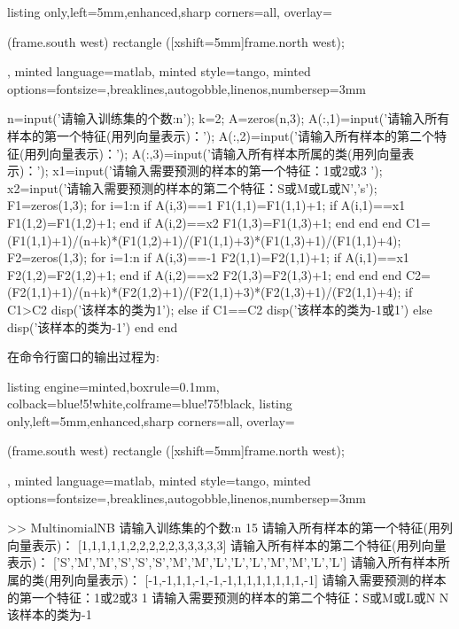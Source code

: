 \documentclass{article}
\begin{document}
\begin{homeworkProblem}
\begin{tcblisting}
{listing only,left=5mm,enhanced,sharp corners=all,
overlay={\begin{tcbclipinterior} (frame.south west)
rectangle ([xshift=5mm]frame.north west);\end{tcbclipinterior}},
minted language=matlab,
minted style=tango,
minted options={fontsize=\normalsize,breaklines,autogobble,linenos,numbersep=3mm}}
n=input('请输入训练集的个数:n\n');
k=2; A=zeros(n,3);%
A(:,1)=input('请输入所有样本的第一个特征(用列向量表示)：\n');
A(:,2)=input('请输入所有样本的第二个特征(用列向量表示)：\n');
A(:,3)=input('请输入所有样本所属的类(用列向量表示)：\n');
x1=input('请输入需要预测的样本的第一个特征：1或2或3 \n');
x2=input('请输入需要预测的样本的第二个特征：S或M或L或N\n','s');
F1=zeros(1,3);
for i=1:n
    if A(i,3)==1
        F1(1,1)=F1(1,1)+1;
        if A(i,1)==x1
            F1(1,2)=F1(1,2)+1;
        end
        if A(i,2)==x2
            F1(1,3)=F1(1,3)+1;
        end
    end
end
C1=(F1(1,1)+1)/(n+k)*(F1(1,2)+1)/(F1(1,1)+3)*(F1(1,3)+1)/(F1(1,1)+4);
F2=zeros(1,3);
for i=1:n
    if A(i,3)==-1
        F2(1,1)=F2(1,1)+1;
        if A(i,1)==x1
            F2(1,2)=F2(1,2)+1;
        end
        if A(i,2)==x2
            F2(1,3)=F2(1,3)+1;
        end
    end
end
C2=(F2(1,1)+1)/(n+k)*(F2(1,2)+1)/(F2(1,1)+3)*(F2(1,3)+1)/(F2(1,1)+4);
if C1>C2
    disp('该样本的类为1');
else if C1==C2
        disp('该样本的类为-1或1')
    else
        disp('该样本的类为-1')
    end
end
\end{tcblisting}
	\newpage
	在命令行窗口的输出过程为:
\begin{tcblisting}{listing engine=minted,boxrule=0.1mm,
colback=blue!5!white,colframe=blue!75!black,
listing only,left=5mm,enhanced,sharp corners=all,
overlay={\begin{tcbclipinterior} (frame.south west)
rectangle ([xshift=5mm]frame.north west);\end{tcbclipinterior}},
minted language=matlab,
minted style=tango,
minted options={fontsize=\normalsize,breaklines,autogobble,linenos,numbersep=3mm}}
>> MultinomialNB
请输入训练集的个数:n
15
请输入所有样本的第一个特征(用列向量表示)：
[1,1,1,1,1,2,2,2,2,2,3,3,3,3,3]
请输入所有样本的第二个特征(用列向量表示)：
['S','M','M','S','S','S','M','M','L','L','L','M','M','L','L']
请输入所有样本所属的类(用列向量表示)：
[-1,-1,1,1,-1,-1,-1,1,1,1,1,1,1,1,-1]
请输入需要预测的样本的第一个特征：1或2或3 
1
请输入需要预测的样本的第二个特征：S或M或L或N
N
该样本的类为-1
\end{tcblisting}

\end{homeworkProblem}
\end{document}
